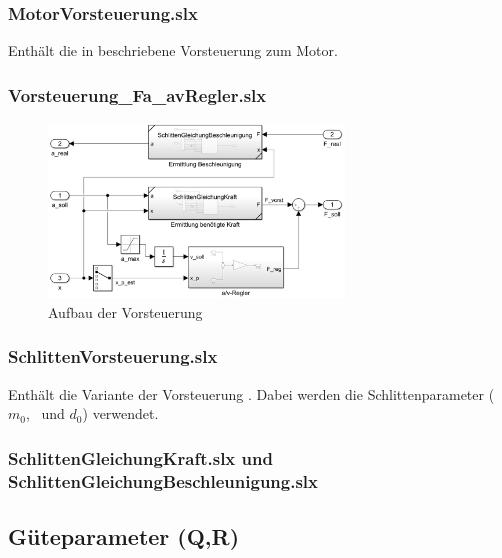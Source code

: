 \subsubsection{MotorVorsteuerung.slx}
Enthält die in  beschriebene Vorsteuerung zum Motor.

\subsubsection{Vorsteuerung\_Fa\_avRegler.slx}


\begin{figure}
	\centering
		\includegraphics[width=0.7\textwidth]{Bilder/Simulink/Fa_vorst.PNG}
	\caption{Aufbau der Vorsteuerung}
	\label{fig:simfav}
\end{figure}

\subsubsection{SchlittenVorsteuerung.slx}
Enthält die  Variante der Vorsteuerung .
Dabei werden die Schlittenparameter ($m_0$, \Fco\ und $d_0$) verwendet. 

\subsubsection{SchlittenGleichungKraft.slx und SchlittenGleichungBeschleunigung.slx}


\subsection{\init}


\subsection{Güteparameter (Q,R)}\label{subsec:simqr}

